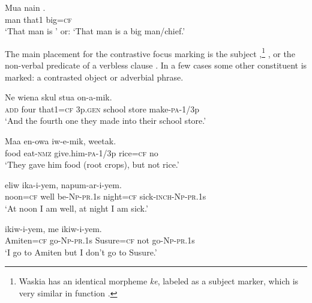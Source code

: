 \ea%
\label{ex:x1691}
\gll Mua  nain  . \\
man  that1  big=\textsc{cf}      \\
\glt`That man is \textsc{'} or: `That man is a big man/chief.'
\z


The main placement for the contrastive focus marking is the subject ,\footnote{Waskia has an identical morpheme \textit{ke}, labeled as a subject marker, which is very similar in function \citep[36]{RossEtAl1978}%
.} , or the non-verbal predicate of a verbless clause . In a few cases some other constituent is marked: a contrasted object or adverbial phrase.

\ea%
\label{ex:x1692}
\gll Ne     wiena  skul  stua  on-a-mik.\\
\textsc{add}  four  that1=\textsc{cf}  3p.\textsc{gen}  school  store  make-\textsc{pa}-1/3p\\
\glt`And the fourth one they made into their school store.'
\z


\ea%
\label{ex:x1697}
\gll Maa  en-owa  iw-e-mik,   weetak. \\
food  eat-\textsc{nmz}  give.him-\textsc{pa}-1/3p  rice=\textsc{cf}  no     \\
\glt`They gave him food (root crops), but not rice.'
\z


\ea%
\label{ex:x1693}
\gll {}  eliw  ika-i-yem,    napum-ar-i-yem. \\
noon=\textsc{cf}  well  be-\textsc{Np}-\textsc{pr}.1s  night=\textsc{cf}  sick-\textsc{inch}-\textsc{Np}-\textsc{pr}.1s      \\
\glt`At noon I am well, at night I am sick.'
\z


\ea%
\label{ex:x1694}
\gll {}  ikiw-i-yem,    me  ikiw-i-yem. \\
Amiten=\textsc{cf}  go-\textsc{Np}-\textsc{pr}.1s  Susure=\textsc{cf}  not  go-\textsc{Np}-\textsc{pr}.1s      \\
\glt`I go to Amiten but I don't go to Susure.'
\z


